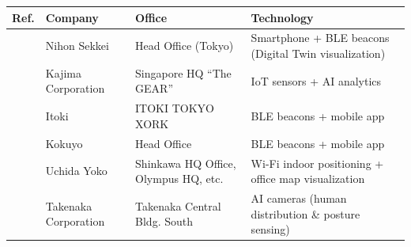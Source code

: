 \centering
\small
\setlength{\tabcolsep}{4pt}
\renewcommand{\arraystretch}{1.2}
\begin{tabularx}{\textwidth}{l p{3cm} p{4cm} p{8cm}}
\toprule
\textbf{Ref.} & \textbf{Company} & \textbf{Office} & \textbf{Technology} \\
\midrule
\cite{nihonsekkeiinc.RealtimeVisualization2024} & Nihon Sekkei & Head Office (Tokyo) & Smartphone + BLE beacons (Digital Twin visualization) \\
\cite{the_gear_kajima_2024} & Kajima Corporation & Singapore HQ ``The GEAR'' & IoT sensors + AI analytics\\
\cite{itokiITOKI2011} & Itoki & ITOKI TOKYO XORK & BLE beacons + mobile app \\
\cite{kokuyoco.OneYearRecords2021} & Kokuyo & Head Office & BLE beacons + mobile app \\
\cite{uchidayokoPressReleaseUchidaYoko2024} & Uchida Yoko & Shinkawa HQ Office, Olympus HQ, etc. & Wi-Fi indoor positioning + office map visualization \\
\cite{tanaka_development_2022} & Takenaka Corporation & Takenaka Central Bldg. South & AI cameras (human distribution \& posture sensing) \\
\bottomrule
\end{tabularx}
